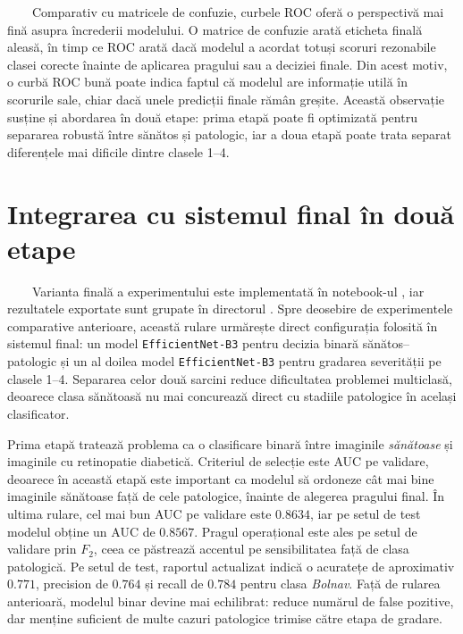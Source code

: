 \documentclass[12pt, a4paper, twoside, romanian]{teza-upb}
\begin{document}
\ \ \ \ Comparativ cu matricele de confuzie, curbele ROC oferă o perspectivă mai fină asupra
încrederii modelului. O matrice de confuzie arată eticheta finală aleasă, în timp ce ROC arată dacă
modelul a acordat totuși scoruri rezonabile clasei corecte înainte de aplicarea pragului sau a
deciziei finale. Din acest motiv, o curbă ROC bună poate indica faptul că modelul are informație utilă
în scorurile sale, chiar dacă unele predicții finale rămân greșite. Această observație susține și
abordarea în două etape: prima etapă poate fi optimizată pentru separarea robustă între sănătos și
patologic, iar a doua etapă poate trata separat diferențele mai dificile dintre clasele 1--4.
\bigskip

\section{Integrarea cu sistemul final în două etape}

\ \ \ \ Varianta finală a experimentului este implementată în notebook-ul
, iar rezultatele
exportate sunt grupate în directorul . Spre deosebire de
experimentele comparative anterioare, această rulare urmărește direct configurația folosită în
sistemul final: un model \texttt{EfficientNet-B3} pentru decizia binară sănătos--patologic și un al
doilea model \texttt{EfficientNet-B3} pentru gradarea severității pe clasele 1--4. Separarea celor două
sarcini reduce dificultatea problemei multiclasă, deoarece clasa sănătoasă nu mai concurează direct cu
stadiile patologice în același clasificator.
\bigskip

Prima etapă tratează problema ca o clasificare binară între imaginile \textit{sănătoase} și imaginile
cu retinopatie diabetică. Criteriul de selecție este AUC pe validare, deoarece în această etapă este
important ca modelul să ordoneze cât mai bine imaginile sănătoase față de cele patologice, înainte de
alegerea pragului final. În ultima rulare, cel mai bun AUC pe validare este \(0.8634\), iar pe setul de
test modelul obține un AUC de \(0.8567\). Pragul operațional este ales pe setul de validare prin
\(F_2\), ceea ce păstrează accentul pe sensibilitatea față de clasa patologică. Pe setul de test,
raportul actualizat indică o acuratețe de aproximativ \(0.771\), precision de \(0.764\) și recall de
\(0.784\) pentru clasa \textit{Bolnav}. Față de rularea anterioară, modelul binar devine mai echilibrat:
reduce numărul de false pozitive, dar menține suficient de multe cazuri patologice trimise către etapa
de gradare.
\bigskip
\end{document}
